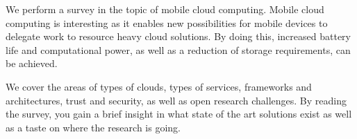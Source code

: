 We perform a survey in the topic of mobile cloud computing. 
Mobile cloud computing is interesting as it enables new possibilities for mobile devices to delegate work to resource heavy cloud solutions.
By doing this, increased battery life and computational power, as well as a reduction of storage requirements, can be achieved. 

We cover the areas of types of clouds, types of services, frameworks and architectures, trust and security, as well as open research challenges.
By reading the survey, you gain a brief insight in what state of the art solutions exist as well as a taste on where the research is going.